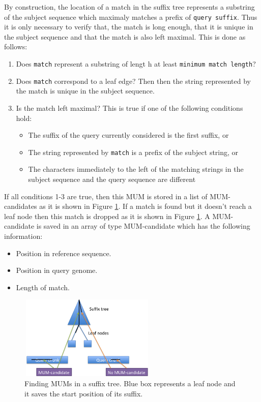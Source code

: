 \documentclass[3p,times]{elsarticle}
\begin{document}
  By construction, the location of a match in the suffix tree represents a substring of the subject sequence which maximaly matches a prefix of
  \texttt{query suffix}. Thus it is only necessary to verify that, the match is long enough, that it is unique in the subject sequence and that 
  the match is also left maximal. This is done as follows:
    \begin{enumerate}
  \item
  Does \texttt{match} represent a substring of lengt h at least \texttt{minimum match length}?
   \item 
  Does \texttt{match} correspond to a leaf edge? Then  then the string represented by the match is unique in the subject sequence.
  \item   
  Is the match left maximal? This is true if one of the following conditions hold:
  \begin{itemize}
  \item   
  The suffix of the query currently considered is the first suffix, or 
  \item 
  The string represented by \texttt{match} is a prefix of the subject string,  or
  \item  
  The characters immediately to the left of the matching strings in the subject sequence and the query sequence are different
  \end{itemize}
  \end{enumerate}
  If all conditions 1-3 are true, then this MUM is stored in a list of MUM-candidates as it is shown in Figure \ref{candidates}. If a match is found but it doesn't reach a leaf node then this match is dropped as it is shown in Figure \ref{candidates}. A MUM-candidate is saved in an array of type MUM-candidate which has the following information:
  \begin{itemize}
    \item Position in reference sequence.
    \item Position in query genome.
    \item Length of match.
  \end{itemize}
 \begin{figure}[htb]  
 \begin{center} 
  \includegraphics[width=6.5cm,height=4cm]{MUM-candidates.png}
 \end{center} 
 \caption{Finding MUMs in a suffix tree. Blue box represents a leaf node and it saves the start position of its suffix.} 
 \label{candidates} 
 \end{figure}  
\end{document}
